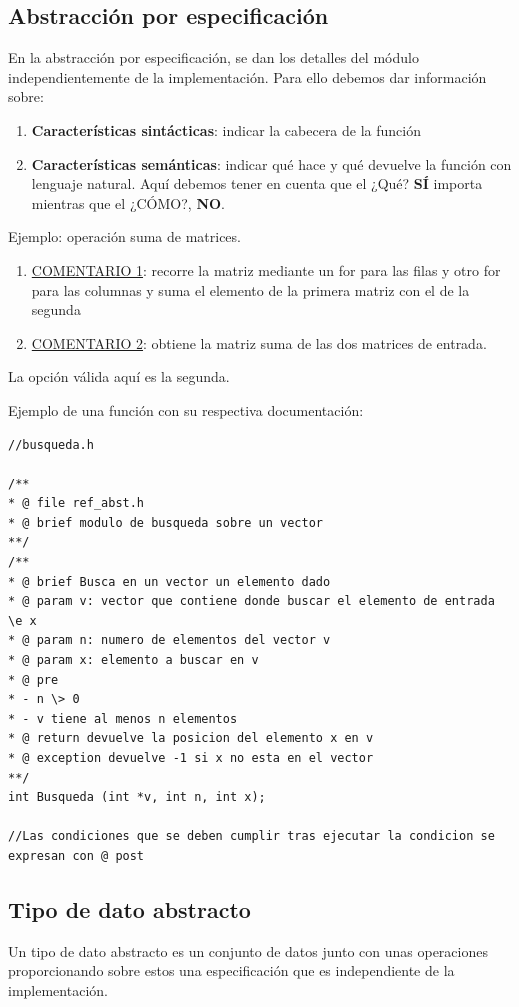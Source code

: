 \documentclass[10pt,a4paper,spanish]{report}
\begin{document}
\subsection{\textcolor[rgb]{0.8,0.2,0.2}Abstracción por especificación}
\noindent
En la abstracción por especificación, se dan los detalles del módulo independientemente de la implementación. Para ello debemos dar información sobre:
\begin{enumerate}[$\spadesuit$]
\item \textbf{\textcolor[rgb]{0.8,0.2,0.2}{Características sintácticas}}: indicar la cabecera de la función
\item \textbf{\textcolor[rgb]{0.8,0.2,0.2}{Características semánticas}}: indicar qué hace y qué devuelve la función con lenguaje natural. Aquí debemos tener en cuenta que el ¿Qué? \textbf{SÍ} importa mientras que el ¿CÓMO?, \textbf{NO}.
\end{enumerate}

\noindent
Ejemplo: operación suma de matrices.
\begin{enumerate}[$\spadesuit$]
\item \underline{COMENTARIO 1}: recorre la matriz mediante un for para las filas y otro for para las columnas y suma el elemento de la primera matriz con el de la segunda
\item \underline{COMENTARIO 2}: obtiene la matriz suma de las dos matrices de entrada.
\end{enumerate}

\noindent
La opción válida aquí es la segunda.

\noindent
Ejemplo de una función con su respectiva documentación:
\begin{verbatim}
//busqueda.h

/**
* @ file ref_abst.h
* @ brief modulo de busqueda sobre un vector
**/
/**
* @ brief Busca en un vector un elemento dado
* @ param v: vector que contiene donde buscar el elemento de entrada \e x
* @ param n: numero de elementos del vector v
* @ param x: elemento a buscar en v
* @ pre
* - n \> 0
* - v tiene al menos n elementos
* @ return devuelve la posicion del elemento x en v
* @ exception devuelve -1 si x no esta en el vector
**/
int Busqueda (int *v, int n, int x);

//Las condiciones que se deben cumplir tras ejecutar la condicion se expresan con @ post
\end{verbatim}

\subsection{\textcolor[rgb]{0.8,0.2,0.2}Tipo de dato abstracto}
\noindent
Un tipo de dato abstracto es un conjunto de datos junto con unas operaciones proporcionando sobre estos una especificación que es independiente de la implementación.
\end{document}
